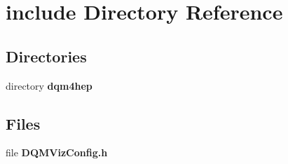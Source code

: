 \section{include Directory Reference}
\label{dir_8ee1a5e78eaec319fe5d64075812fc61}
\subsection*{Directories}
\begin{DoxyCompactItemize}
\item 
directory {\bf dqm4hep}
\end{DoxyCompactItemize}
\subsection*{Files}
\begin{DoxyCompactItemize}
\item 
file {\bf D\+Q\+M\+Viz\+Config.\+h}
\end{DoxyCompactItemize}
